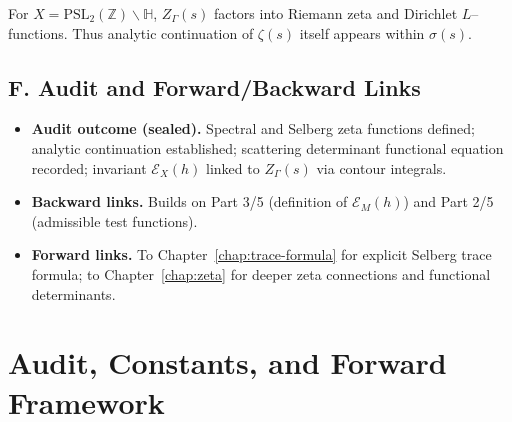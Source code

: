 \begin{example}
For $X=\mathrm{PSL}_2(\mathbb Z)\backslash\mathbb H$, $Z_\Gamma(s)$ factors into Riemann zeta and Dirichlet $L$–functions.
Thus analytic continuation of $\zeta(s)$ itself appears within $\sigma(s)$.
\end{example}

\subsection*{F. Audit and Forward/Backward Links}
\label{subsec:zeta-audit}

\begin{itemize}
  \item \textbf{Audit outcome (sealed).}
        Spectral and Selberg zeta functions defined; analytic continuation established;
        scattering determinant functional equation recorded; invariant $\mathcal E_X(h)$
        linked to $Z_\Gamma(s)$ via contour integrals.
  \item \textbf{Backward links.}
        Builds on Part 3/5 (definition of $\mathcal E_M(h)$) and Part 2/5 (admissible test functions).
  \item \textbf{Forward links.}
        To Chapter~\ref{chap:trace-formula} for explicit Selberg trace formula;
        to Chapter~\ref{chap:zeta} for deeper zeta connections and functional determinants.
\end{itemize}



\section{Audit, Constants, and Forward Framework}
\label{sec:audit-constants-framework}

